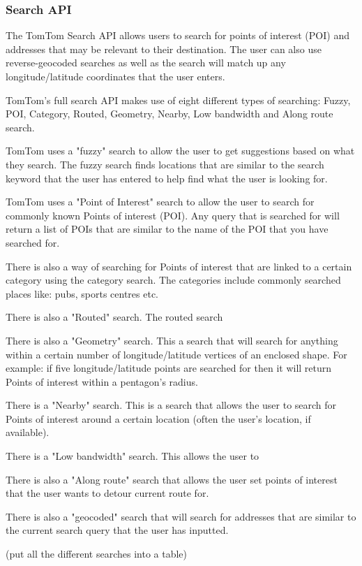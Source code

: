 \documentclass[12pt,a4paper]{article}
\begin{document}
\subsubsection{Search API}
The TomTom Search API allows users to search for points of interest (POI) and addresses that may be relevant to their destination. The user can also use reverse-geocoded searches as well as the search will match up any longitude/latitude coordinates that the user enters.

TomTom's full search API makes use of eight different types of searching: Fuzzy, POI, Category, Routed, Geometry, Nearby, Low bandwidth and Along route search.

TomTom uses a "fuzzy" search to allow the user to get suggestions based on what they search. The fuzzy search finds locations that are similar to the search keyword that the user has entered to help find what the user is looking for. 

TomTom uses a "Point of Interest" search to allow the user to search for commonly known Points of interest (POI). Any query that is searched for will return a list of POIs that are similar to the name of the POI that you have searched for.

There is also a way of searching for Points of interest that are linked to a certain category using the category search. The categories include commonly searched places like: pubs, sports centres etc.

There is also a "Routed" search. The routed search 

There is also a "Geometry" search. This a search that will search for anything within a certain number of longitude/latitude vertices of an enclosed shape. For example: if five longitude/latitude points are searched for then it will return Points of interest within a pentagon's radius. 

There is a "Nearby" search. This is a search that allows the user to search for Points of interest around a certain location (often the user's location, if available).

There is a "Low bandwidth" search. This allows the user to 

There is also a "Along route" search that allows the user set points of interest that the user wants to detour current route for. 

There is also a "geocoded" search that will search for addresses that are similar to the current search query that the user has inputted.

(put all the different searches into a table)
\end{document}

